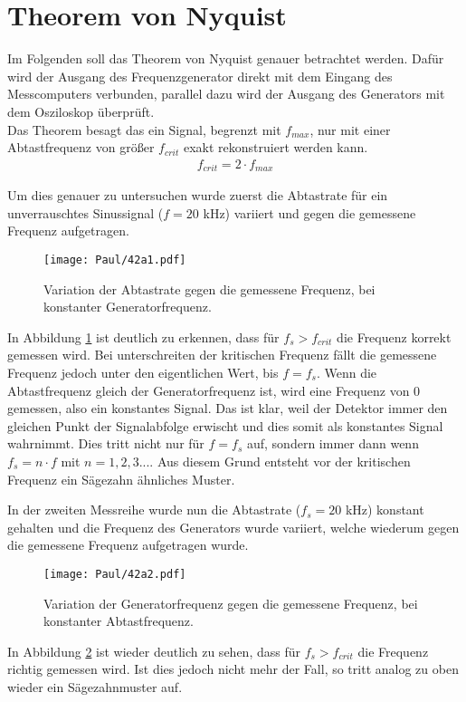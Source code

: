 \section{Theorem von Nyquist}

Im Folgenden soll das Theorem von Nyquist genauer betrachtet werden. Dafür wird der Ausgang des Frequenzgenerator direkt mit dem Eingang des Messcomputers verbunden, parallel dazu wird der Ausgang des Generators mit dem Osziloskop überprüft.\\
Das Theorem besagt das ein Signal, begrenzt mit $f_{max}$, nur mit einer Abtastfrequenz von größer $f_{crit}$ exakt rekonstruiert werden kann.
\begin{align}
    f_{crit} = 2 \cdot f_{max}
\end{align}


Um dies genauer zu untersuchen wurde zuerst die Abtastrate für ein unverrauschtes Sinussignal ($f = 20$ kHz) variiert und gegen die gemessene Frequenz aufgetragen.
\begin{figure}[h]
    \centering
    \texttt{[image: Paul/42a1.pdf]}
    \caption{Variation der Abtastrate gegen die gemessene Frequenz, bei konstanter Generatorfrequenz.}
    \label{fig:42a1}
\end{figure}

In Abbildung \ref{fig:42a1} ist deutlich zu erkennen, dass für $f_s > f_{crit}$ die Frequenz korrekt gemessen wird. Bei unterschreiten der kritischen Frequenz fällt die gemessene Frequenz jedoch unter den eigentlichen Wert, bis $f = f_s$. Wenn die Abtastfrequenz gleich der Generatorfrequenz ist, wird eine Frequenz von 0 gemessen, also ein konstantes Signal. Das ist klar, weil der Detektor immer den gleichen Punkt der Signalabfolge erwischt und dies somit als konstantes Signal wahrnimmt. Dies tritt nicht nur für $f = f_s$ auf, sondern immer dann wenn $f_s = n \cdot f$ mit $ n= 1,2,3...$. Aus diesem Grund entsteht vor der kritischen Frequenz ein Sägezahn ähnliches Muster.

\newpage
In der zweiten Messreihe wurde nun die Abtastrate ($f_s = 20$ kHz) konstant gehalten und die Frequenz des Generators wurde variiert, welche wiederum gegen die gemessene Frequenz aufgetragen wurde.
\begin{figure}[h]
    \centering
    \texttt{[image: Paul/42a2.pdf]}
    \caption{Variation der Generatorfrequenz gegen die gemessene Frequenz, bei konstanter Abtastfrequenz.}
    \label{fig:42a2}
\end{figure}
In Abbildung \ref{fig:42a2} ist wieder deutlich zu sehen, dass für $f_s > f_{crit}$ die Frequenz richtig gemessen wird. Ist dies jedoch nicht mehr der Fall, so tritt analog zu oben wieder ein Sägezahnmuster auf.


